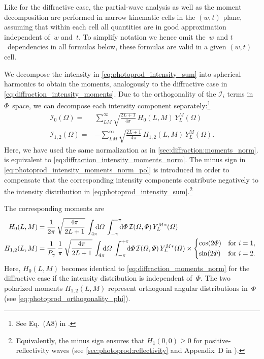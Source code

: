 Like for the diffractive case, the partial-wave analysis as well as
the moment decomposition are performed in narrow kinematic cells in
the $(w, t)$ plane, assuming that within each cell all quantities are
in good approximation independent of~$w$ and~$t$.  To simplify
notation we hence omit the~$w$ and $t$~dependencies in all formulas
below, \ie these formulas are valid in a given $(w, t)$ cell.

We decompose the intensity in \cref{eq:photoprod_intensity_sum} into
spherical harmonics to obtain the moments, analogously to the
diffractive case in \cref{eq:diffraction_intensity_moments}.  Due to
the orthogonality of the $\mathcal{I}_i$ terms in $\Phi$~space, we can
decompose each intensity component separately:\footnote{See Eq.~(A8)
in .}
\begin{align}
  \label{eq:photoprod_intensity_moments_norm_unpol}
  \mathcal{I}_0(\Omega)
  ={}& \sum_{L M}^\infty \sqrt{\frac{2 L + 1}{4 \pi}}\, H_0(L, M)\, Y_L^M(\Omega)
  \\
  \label{eq:photoprod_intensity_moments_norm_pol}
  \mathcal{I}_{1, 2}(\Omega)
  ={}& -\sum_{L M}^\infty \sqrt{\frac{2 L + 1}{4 \pi}}\, H_{1, 2}(L, M)\, Y_L^M(\Omega).
\end{align}
Here, we have used the same normalization as in
\cref{sec:diffraction:moments_norm}.
 is equivalent to
\cref{eq:diffraction_intensity_moments_norm}.  The minus sign in
\cref{eq:photoprod_intensity_moments_norm_pol} is introduced in order
to compensate that the corresponding intensity components contribute
negatively to the intensity distribution in
\cref{eq:photoprod_intensity_sum}.\footnote{Equivalently, the minus
sign ensures that $H_1(0, 0) \geq 0$ for positive-reflectivity waves
(see \cref{sec:photoprod:reflectivity} and Appendix~D in
).}

The corresponding moments are
\begin{align}
  \label{eq:photoprod_moments_norm_unpol}
  H_0(L, M)
  ={}& \frac{1}{2 \pi}\, \sqrt{\frac{4 \pi}{2 L + 1}}\, \int_{4 \pi}\!\!\! \dif{\Omega}\, \int_{-\pi}^{+\pi}\!\!\! \dif{\Phi}\,
  \mathcal{I}(\Omega, \Phi)\, Y_L^{M *}(\Omega)
  \\
  \label{eq:photoprod_moments_norm_pol}
  H_{1, 2}(L, M)
  ={}& \frac{1}{P_\gamma}\, \frac{1}{\pi}\, \sqrt{\frac{4 \pi}{2 L + 1}}\, \int_{4 \pi}\!\!\! \dif{\Omega}\, \int_{-\pi}^{+\pi}\!\!\! \dif{\Phi}\,
  \mathcal{I}(\Omega, \Phi)\, Y_L^{M *}(\Omega) \times \begin{cases*}
    \cos(2 \Phi) & for $i = 1$, \\
    \sin(2 \Phi) & for $i = 2$.
  \end{cases*}
\end{align}
Here, $H_0(L, M)$ becomes identical to
\cref{eq:diffraction_moments_norm} for the diffractive case if the
intensity distribution is independent of~$\Phi$.  The two
polarized moments $H_{1, 2}(L, M)$ represent orthogonal angular
distributions in~$\Phi$ (see \cref{eq:photoprod_orthogonality_phi}).


